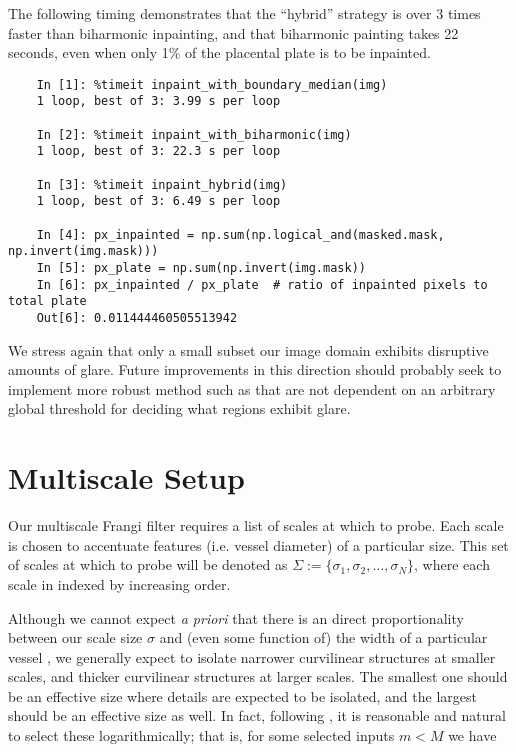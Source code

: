     The following timing demonstrates that the ``hybrid'' strategy is over 3 times faster than biharmonic inpainting, and that biharmonic painting takes 22 seconds, even when only 1\% of the placental plate is to be inpainted.
    
    \begin{lstlisting}
    In [1]: %timeit inpaint_with_boundary_median(img)
    1 loop, best of 3: 3.99 s per loop
    
    In [2]: %timeit inpaint_with_biharmonic(img)
    1 loop, best of 3: 22.3 s per loop
    
    In [3]: %timeit inpaint_hybrid(img)
    1 loop, best of 3: 6.49 s per loop
    
    In [4]: px_inpainted = np.sum(np.logical_and(masked.mask, np.invert(img.mask)))
    In [5]: px_plate = np.sum(np.invert(img.mask))
    In [6]: px_inpainted / px_plate  # ratio of inpainted pixels to total plate 
    Out[6]: 0.011444460505513942
    \end{lstlisting}

    
    We stress again that only a small subset our image domain exhibits disruptive amounts of glare. Future improvements in this direction should probably seek to implement more robust method such as \cite{lange2005glare} that are not dependent on an arbitrary global
    threshold for deciding what regions exhibit glare.
    
    
\section{Multiscale Setup}

    Our multiscale Frangi filter requires a list of scales at which to probe. Each scale is chosen to accentuate features (i.e. vessel diameter) of a particular size.
    This set of scales at which to probe will be denoted as $\Sigma := \{ \sigma_1, \sigma_2, \dots, \sigma_N\}$, where each scale in indexed by increasing order.
    
    Although we cannot expect \textit{a priori} that there is an direct proportionality between our scale size $\sigma$ and (even some function of) the width of a particular vessel \cite{frangi-paper}, we generally expect to isolate
    narrower curvilinear structures at smaller scales, and thicker curvilinear structures at larger scales.  The smallest one should be an effective size where details are expected to be isolated, and the largest should be an effective size as well. In fact, following \cite{Koenderink}, it is reasonable and natural to select these logarithmically; that is, for some selected inputs $m < M$ we have
    
